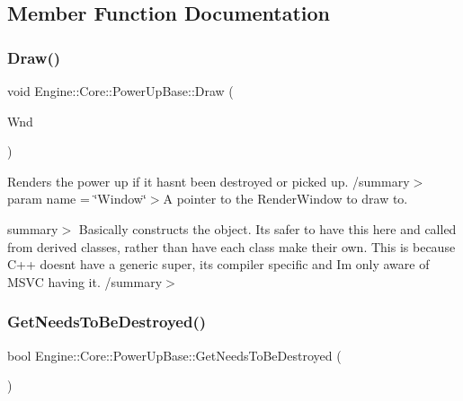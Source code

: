 \subsection{Member Function Documentation}
\mbox{\label{class_engine_1_1_core_1_1_power_up_base_a5d145e5909ed25fb656416fe10ba7052}} 
\subsubsection{\texorpdfstring{Draw()}{Draw()}}
{\footnotesize\ttfamily void Engine\+::\+Core\+::\+Power\+Up\+Base\+::\+Draw (\begin{DoxyParamCaption}\item[{Render\+Window $\ast$}]{Wnd }\end{DoxyParamCaption})}



Renders the power up if it hasn\textquotesingle{}t been destroyed or picked up. /summary$>$ param name = \char`\"{}\+Window\char`\"{}$>$A pointer to the Render\+Window to draw to.

summary$>$ Basically constructs the object. It\textquotesingle{}s safer to have this here and called from derived classes, rather than have each class make their own. This is because C++ doesn\textquotesingle{}t have a generic super, it\textquotesingle{}s compiler specific and I\textquotesingle{}m only aware of M\+S\+VC having it. /summary$>$ \mbox{\label{class_engine_1_1_core_1_1_power_up_base_a2b54cfc2afda10849a05f3095539c682}} 
\subsubsection{\texorpdfstring{Get\+Needs\+To\+Be\+Destroyed()}{GetNeedsToBeDestroyed()}}
{\footnotesize\ttfamily bool Engine\+::\+Core\+::\+Power\+Up\+Base\+::\+Get\+Needs\+To\+Be\+Destroyed (\begin{DoxyParamCaption}\item[{void}]{ }\end{DoxyParamCaption})}

